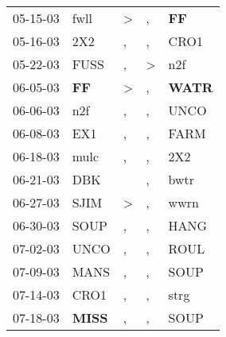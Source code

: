 \begin{supertabular}{p{0.07\textwidth}p{0.06\textwidth}p{0.02\textwidth}p{0.02\textwidth}p{0.06\textwidth}}
          05-15-03\textsuperscript{} &           fwll\textsuperscript{} &     \textgreater &                , &    \textbf{FF\textsuperscript{}} \\
          05-16-03\textsuperscript{} &            2X2\textsuperscript{} &                , &                , &           CRO1\textsuperscript{} \\
          05-22-03\textsuperscript{} &           FUSS\textsuperscript{} &                , &     \textgreater &            n2f\textsuperscript{} \\
          06-05-03\textsuperscript{} &    \textbf{FF\textsuperscript{}} &     \textgreater &                , &  \textbf{WATR\textsuperscript{}} \\
          06-06-03\textsuperscript{} &            n2f\textsuperscript{} &                , &                , &           UNCO\textsuperscript{} \\
          06-08-03\textsuperscript{} &            EX1\textsuperscript{} &                , &                , &           FARM\textsuperscript{} \\
          06-18-03\textsuperscript{} &           mulc\textsuperscript{} &                , &                , &            2X2\textsuperscript{} \\
          06-21-03\textsuperscript{} &            DBK\textsuperscript{} &                  &                , &           bwtr\textsuperscript{} \\
          06-27-03\textsuperscript{} &           SJIM\textsuperscript{} &     \textgreater &                , &           wwrn\textsuperscript{} \\
          06-30-03\textsuperscript{} &           SOUP\textsuperscript{} &                , &                , &           HANG\textsuperscript{} \\
          07-02-03\textsuperscript{} &           UNCO\textsuperscript{} &                , &                , &           ROUL\textsuperscript{} \\
          07-09-03\textsuperscript{} &           MANS\textsuperscript{} &                , &                , &           SOUP\textsuperscript{} \\
          07-14-03\textsuperscript{} &           CRO1\textsuperscript{} &                , &                , &           strg\textsuperscript{} \\
          07-18-03\textsuperscript{} &  \textbf{MISS\textsuperscript{}} &                , &                , &           SOUP\textsuperscript{} \\

\end{supertabular}
